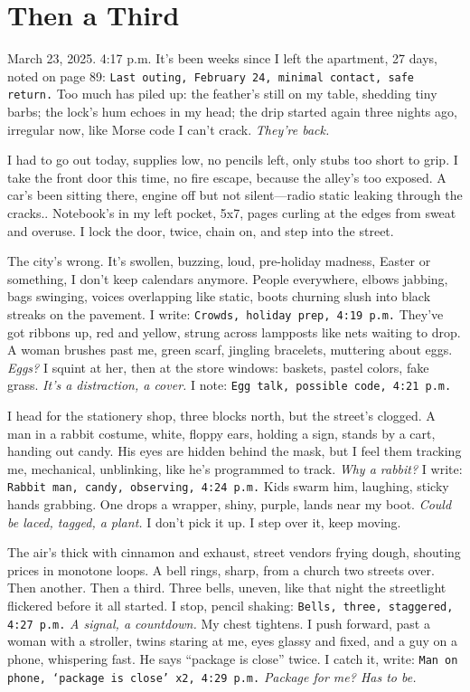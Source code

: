 \documentclass[12pt,oneside]{book} %
\newcommand{\note}[1]{\texttt{#1}}
\begin{document}
\chapter{Then a Third}

March 23, 2025. 4:17 p.m. It’s been weeks since I left the apartment, 27 days, noted on page 89: \note{Last outing, February 24, minimal contact, safe return.} Too much has piled up: the feather’s still on my table, shedding tiny barbs; the lock’s hum echoes in my head; the drip started again three nights ago, irregular now, like Morse code I can’t crack. \textit{They’re back.}

I had to go out today, supplies low, no pencils left, only stubs too short to grip. I take the front door this time, no fire escape, because the alley’s too exposed. A car’s been sitting there, engine off but not silent—radio static leaking through the cracks.. Notebook’s in my left pocket, 5x7, pages curling at the edges from sweat and overuse. I lock the door, twice, chain on, and step into the street.

The city’s wrong. It’s swollen, buzzing, loud, pre-holiday madness, Easter or something, I don’t keep calendars anymore. People everywhere, elbows jabbing, bags swinging, voices overlapping like static, boots churning slush into black streaks on the pavement. I write: \note{Crowds, holiday prep, 4:19 p.m.} They’ve got ribbons up, red and yellow, strung across lampposts like nets waiting to drop. A woman brushes past me, green scarf, jingling bracelets, muttering about eggs. \textit{Eggs?} I squint at her, then at the store windows: baskets, pastel colors, fake grass. \textit{It’s a distraction, a cover.} I note: \note{Egg talk, possible code, 4:21 p.m.}

I head for the stationery shop, three blocks north, but the street’s clogged. A man in a rabbit costume, white, floppy ears, holding a sign, stands by a cart, handing out candy. His eyes are hidden behind the mask, but I feel them tracking me, mechanical, unblinking, like he’s programmed to track. \textit{Why a rabbit?} I write: \note{Rabbit man, candy, observing, 4:24 p.m.} Kids swarm him, laughing, sticky hands grabbing. One drops a wrapper, shiny, purple, lands near my boot. \textit{Could be laced, tagged, a plant.} I don’t pick it up. I step over it, keep moving.

The air’s thick with cinnamon and exhaust, street vendors frying dough, shouting prices in monotone loops. A bell rings, sharp, from a church two streets over. Then another. Then a third. Three bells, uneven, like that night the streetlight flickered before it all started. I stop, pencil shaking: \note{Bells, three, staggered, 4:27 p.m.} \textit{A signal, a countdown.} My chest tightens. I push forward, past a woman with a stroller, twins staring at me, eyes glassy and fixed, and a guy on a phone, whispering fast. He says “package is close” twice. I catch it, write: \note{Man on phone, ‘package is close’ x2, 4:29 p.m.} \textit{Package for me? Has to be.}
\end{document}
